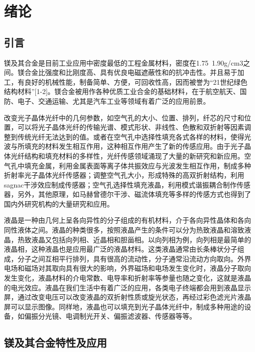 \section{绪论}
\subsection{引言}

镁及其合金是目前工业应用中密度最低的工程金属材料，密度在1.75~1.90g/cm3之间。镁合金比强度和比刚度高、具有优良电磁遮蔽性和的抗冲击性。并且易于加工，有良好的机械性能，制备简单、方便，可回收性高，因而被誉为“21世纪绿色结构材料”[1-2]。镁合金被用作各种优质工业合金的基础材料，在于航空航天、国防、电子、交通运输、尤其是汽车工业等领域有着广泛的应用前景。\par
改变光子晶体光纤中的几何参数，如空气孔的大小、位置、排列，纤芯的尺寸和位置，可以将光子晶体光纤的传输光谱、模式形状、非线性、色散和双折射等因素调整到传统光纤无法达到的值。或者在空气孔中选择性填充各式各样的材料，使得光波与所填充的材料发生相互作用，这种相互作用产生了新的传感应用。由于光子晶体光纤结构和填充材料的多样性，光纤传感领域涌现了大量的新研究和新应用。空气孔中填充金属，利用金属表面等离子体共振效应与光波发生相互作用，制成多种折射率光子晶体光纤传感器；调整空气孔大小，形成特殊的高双折射结构，利用sagnac干涉效应制成传感器；空气孔选择性填充液晶，利用模式谐振耦合制作传感器，另外，其他原理，如马赫曾德尔干涉、磁流体填充等多样的传感方式也得到了国内外研究机构的大量研究和应用。\par
液晶是一种由几何上呈各向异性的分子组成的有机材料，介于各向异性晶体和各向同性液体之间。液晶的种类很多，按照液晶产生的条件可以分为热致液晶和溶致液晶，热致液晶又包括向列相、近晶相和胆甾相。以向列相为例，向列相是最简单的液晶相，这种液晶也是应用最广泛的液晶材料。这类液晶通常由长条棒状分子组成，分子之间互相平行排列，具有很高的流动性，分子通常沿流动方向取向。外界电场和磁场对其取向具有很大的影响，外界磁场和电场发生变化时，液晶分子取向发生变化，液晶材料的介电常数、电导率和折射率等参量也随之变化，这就是液晶的电光效应。液晶在我们生活中有着广泛的应用，各类电子终端都会用到液晶显示屏，通过改变电压可以改变液晶的双折射性质或旋光状态，再经过彩色滤光片液晶屏可以显示图像。同样地，液晶也可以填充到光子晶体光纤中，制成多种用途的设备，如偏振分光镜、电调制光开关、偏振滤波器、传感器等等。\par

\subsection{镁及其合金特性及应用}

